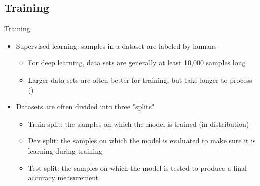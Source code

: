 \documentclass[
	11pt,
]{beamer}
\begin{document}
\subsection{Training}
\begin{frame}{Training}
	\begin{itemize}
		\item Supervised learning: samples in a dataset are labeled by humans
		      \begin{itemize}
			      \item For deep learning, data sets are generally at least 10,000 samples long
			      \item Larger data sets are often better for training, but take longer to process (\cite{banko-brill-2001-mitigating})
		      \end{itemize}
		\item Datasets are often divided into three "splits"
		      \begin{itemize}
			      \item Train split: the samples on which the model is trained (in-distribution)
			      \item Dev split: the samples on which the model is evaluated to make sure it is learning during training
			      \item Test split: the samples on which the model is tested to produce a final accuracy measurement
		      \end{itemize}
	\end{itemize}
\end{frame}
\end{document}
